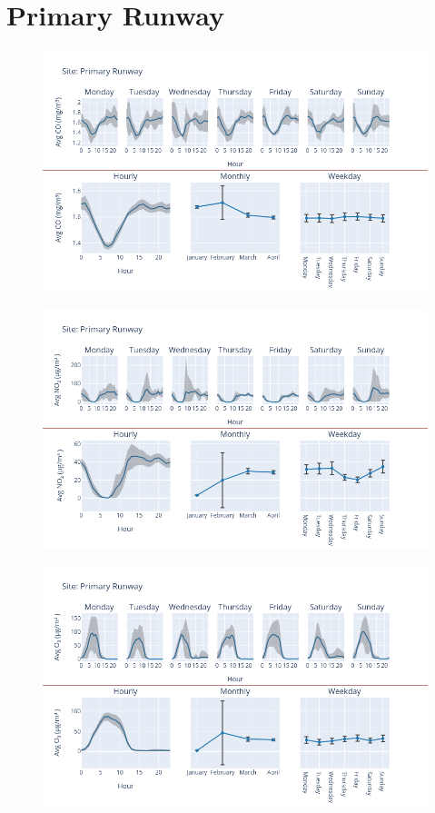 \documentclass[12pt, oneside]{book}
\begin{document}
{\section{Primary Runway}
{\begin{figure}[H] 
 \centering 
\includegraphics[width=.88\textwidth, keepaspectratio]{image98} 
 \end{figure}}{} 

{\begin{figure}[H] 
 \centering 
\includegraphics[width=.88\textwidth, keepaspectratio]{image99} 
 \end{figure}}{} 

{\begin{figure}[H] 
 \centering 
\includegraphics[width=.88\textwidth, keepaspectratio]{image100} 
 \end{figure}}{} 

}
\end{document}
